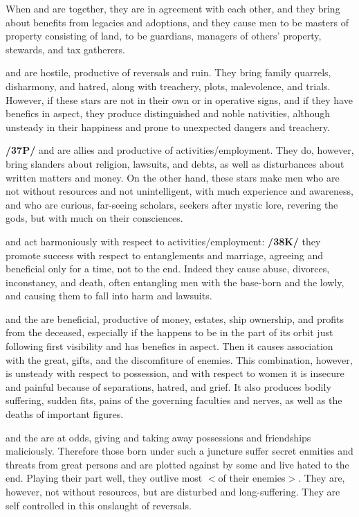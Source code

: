 When \Saturn\xspace and \Jupiter\xspace are together, they are in agreement with each other, and they bring about benefits from legacies and adoptions, and they cause men to be masters of property consisting of land, to be guardians, managers of others’ property, stewards, and tax gatherers.

\Saturn\xspace and \Mars\xspace are hostile, productive of reversals and ruin. They bring family quarrels, disharmony,
and hatred, along with treachery, plots, malevolence, and trials. However, if these stars are not in their own or in operative signs, and if they have benefics in aspect, they produce distinguished and noble nativities, although unsteady in their happiness and prone to unexpected dangers and treachery.

\textbf{/37P/}\Saturn\xspace and \Mercury\xspace are allies and productive of activities/employment. They do, however, bring slanders about religion, lawsuits, and debts, as well as disturbances about written matters and money. On the other hand, these stars make men who are not without resources and not unintelligent, with much experience and awareness, and who are curious, far-seeing scholars, seekers after mystic lore,
revering the gods, but with much on their consciences.

\Saturn\xspace and \Venus\xspace act harmoniously with respect to activities/employment: \textbf{/38K/} they promote success with respect to entanglements and marriage, agreeing and beneficial only for a time, not to the end. Indeed they cause abuse, divorces, inconstancy, and death, often entangling men with the base-born and the lowly, and causing them to fall into harm and lawsuits.

\Saturn\xspace and the \Moon\xspace are beneficial, productive of money, estates, ship ownership, and profits from the deceased, \mndl especially if the \Moon\xspace happens to be in the part of its orbit just following first visibility and has benefics in aspect. Then it causes association with the great, gifts, and the discomfiture of enemies. This combination, however, is unsteady with respect to possession, and with respect to women it is insecure and painful because of separations, hatred, and grief. It also produces bodily suffering, sudden fits, pains of
the governing faculties and nerves, as well as the deaths of important figures.

\Saturn\xspace and the \Sun\xspace are at odds, giving and taking away possessions and friendships maliciously. Therefore those born under such a juncture suffer secret enmities and threats from great persons and are plotted against by some and live hated to the end. Playing their part well, they outlive most $<$of their enemies$>$. They are, however, not without resources, but are disturbed and long-suffering. They are self controlled in this onslaught of reversals.

